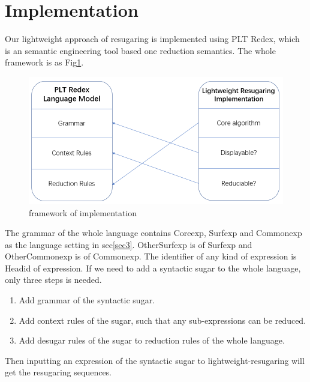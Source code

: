 \section{Implementation}
\label{sec4}

Our lightweight approach of resugaring is implemented using PLT Redex\cite{SEwPR}, which is an semantic engineering tool based one reduction semantics. The whole framework is as Fig\ref{fig:frame}.

\begin{figure}[h]
	\centering
	\includegraphics[width=12cm]{images/frame.png}
	\caption{framework of implementation}
	\label{fig:frame}
\end{figure}

The grammar of the whole language contains Coreexp, Surfexp and Commonexp as the language setting in sec\ref{sec3}. OtherSurfexp is of Surfexp and OtherCommonexp is of Commonexp. The identifier of any kind of expression is Headid of expression. If we need to add a syntactic sugar to the whole language, only three steps is needed.

\begin{enumerate}
\item Add grammar of the syntactic sugar.
\item Add context rules of the sugar, such that any sub-expressions can be reduced.
\item Add desugar rules of the sugar to reduction rules of the whole language.
\end{enumerate}

Then inputting an expression of the syntactic sugar to lightweight-resugaring will get the resugaring sequences.
